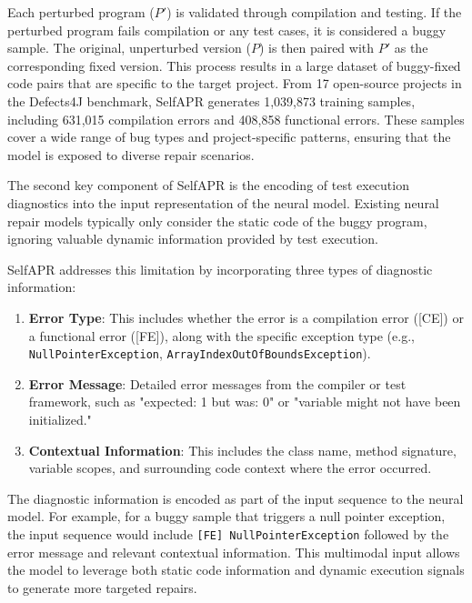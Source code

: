 \documentclass[manuscript,screen,review]{acmart}
\begin{document}
Each perturbed program (\(P'\)) is validated through compilation and testing. If the perturbed program fails compilation or any test cases, it is considered a buggy sample. The original, unperturbed version (\(P\)) is then paired with \(P'\) as the corresponding fixed version. This process results in a large dataset of buggy-fixed code pairs that are specific to the target project. From 17 open-source projects in the Defects4J benchmark, SelfAPR generates 1,039,873 training samples, including 631,015 compilation errors and 408,858 functional errors. These samples cover a wide range of bug types and project-specific patterns, ensuring that the model is exposed to diverse repair scenarios.

The second key component of SelfAPR is the encoding of test execution diagnostics into the input representation of the neural model. Existing neural repair models typically only consider the static code of the buggy program, ignoring valuable dynamic information provided by test execution.

SelfAPR addresses this limitation by incorporating three types of diagnostic information:

\begin{enumerate}
\item \textbf{Error Type}: This includes whether the error is a compilation error ([CE]) or a functional error ([FE]), along with the specific exception type (e.g., \texttt{NullPointerException}, \texttt{ArrayIndexOutOfBoundsException}).

\item \textbf{Error Message}: Detailed error messages from the compiler or test framework, such as "expected: 1 but was: 0" or "variable might not have been initialized."

\item \textbf{Contextual Information}: This includes the class name, method signature, variable scopes, and surrounding code context where the error occurred.
\end{enumerate}

The diagnostic information is encoded as part of the input sequence to the neural model. For example, for a buggy sample that triggers a null pointer exception, the input sequence would include \texttt{[FE] NullPointerException} followed by the error message and relevant contextual information. This multimodal input allows the model to leverage both static code information and dynamic execution signals to generate more targeted repairs.
\end{document}
